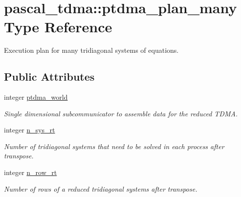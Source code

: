 \hypertarget{structpascal__tdma_1_1ptdma__plan__many}{}\section{pascal\+\_\+tdma\+::ptdma\+\_\+plan\+\_\+many Type Reference}
\label{structpascal__tdma_1_1ptdma__plan__many}


Execution plan for many tridiagonal systems of equations.  


\subsection*{Public Attributes}
\begin{DoxyCompactItemize}
\item 
integer \mbox{\hyperlink{structpascal__tdma_1_1ptdma__plan__many_acb7e645e37c791564905c6e2808db0c6}{ptdma\+\_\+world}}
\begin{DoxyCompactList}\small\item\em Single dimensional subcommunicator to assemble data for the reduced T\+D\+MA. \end{DoxyCompactList}\item 
integer \mbox{\hyperlink{structpascal__tdma_1_1ptdma__plan__many_a22b42947ab742f83aad3bbeb3a42a0f6}{n\+\_\+sys\+\_\+rt}}
\begin{DoxyCompactList}\small\item\em Number of tridiagonal systems that need to be solved in each process after transpose. \end{DoxyCompactList}\item 
integer \mbox{\hyperlink{structpascal__tdma_1_1ptdma__plan__many_ad94248e2aa0653f151f0575d62d6fff7}{n\+\_\+row\+\_\+rt}}
\begin{DoxyCompactList}\small\item\em Number of rows of a reduced tridiagonal systems after transpose. \end{DoxyCompactList}\end{DoxyCompactItemize}
\textbf{ }\par
